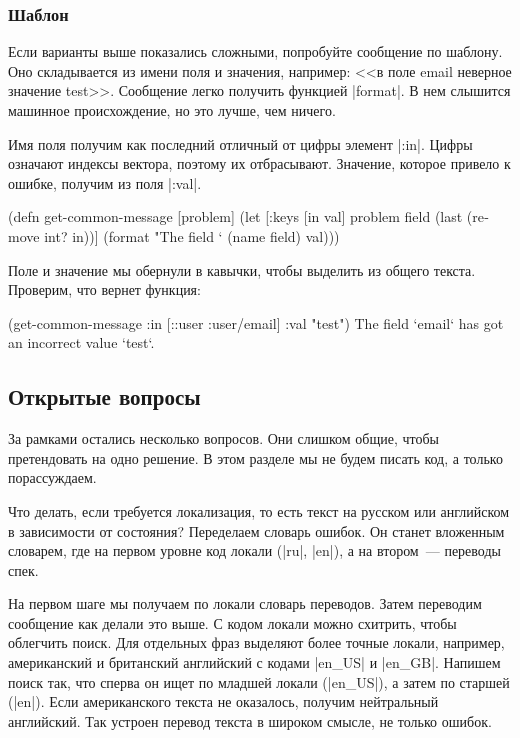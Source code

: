 \subsubsection{Шаблон}

Если варианты выше показались сложными, попробуйте сообщение по шаблону. Оно
складывается из имени поля и значения, например: <<в поле email неверное
значение test>>. Сообщение легко получить функцией \spverb|format|. В нем
слышится машинное происхождение, но это лучше, чем ничего.

Имя поля получим как последний отличный от цифры элемент \spverb|:in|. Цифры
означают индексы вектора, поэтому их отбрасывают. Значение, которое привело к
ошибке, получим из поля \spverb|:val|.

\begin{english}
  \begin{clojure}
(defn get-common-message [problem]
  (let [{:keys [in val]} problem
        field (last (remove int? in))]
    (format "The field `%
            (name field) val)))
  \end{clojure}
\end{english}

Поле и значение мы обернули в кавычки, чтобы выделить из общего
текста. Проверим, что вернет функция:

\begin{english}
  \begin{clojure}
(get-common-message {:in [::user :user/email] :val "test"})
The field `email` has got an incorrect value `test`.
  \end{clojure}
\end{english}

\subsection{Открытые вопросы}

За рамками остались несколько вопросов. Они слишком общие, чтобы претендовать на
одно решение. В этом разделе мы не будем писать код, а только порассуждаем.

Что делать, если требуется локализация, то есть текст на русском или английском
в зависимости от состояния? Переделаем словарь ошибок. Он станет вложенным
словарем, где на первом уровне код локали (\spverb|ru|, \spverb|en|), а на
втором~--- переводы спек.

На первом шаге мы получаем по локали словарь переводов. Затем переводим
сообщение как делали это выше. С кодом локали можно схитрить, чтобы облегчить
поиск. Для отдельных фраз выделяют более точные локали, например, американский и
британский английский с кодами \spverb|en_US| и \spverb|en_GB|. Напишем поиск
так, что сперва он ищет по младшей локали (\spverb|en_US|), а затем по старшей
(\spverb|en|). Если американского текста не оказалось, получим нейтральный
английский. Так устроен перевод текста в широком смысле, не только ошибок.

